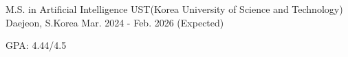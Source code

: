 

\begin{cventries}

  

    \cventry
    {M.S. in Artificial Intelligence} %
    {
    {UST(Korea University of Science and Technology)}
    } %
    {Daejeon, S.Korea} %
    {Mar. 2024 - Feb. 2026 (Expected)} %
    {
      \begin{cvitems} %
        \item{GPA: 4.44/4.5}
      \end{cvitems}
    }
  

\end{cventries}

